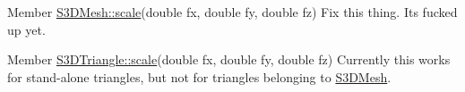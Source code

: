 \label{todo__todo000001}
\hypertarget{todo__todo000001}{}
 
\begin{DoxyDescription}
\item[Member \hyperlink{class_s3_d_mesh_ad1de35530a123dbb515e37afc8ecc0e3}{S3DMesh::scale}(double fx, double fy, double fz) ]Fix this thing. Its fucked up yet. 
\end{DoxyDescription}

\label{todo__todo000002}
\hypertarget{todo__todo000002}{}
 
\begin{DoxyDescription}
\item[Member \hyperlink{class_s3_d_triangle_a0808a047e513fb2322e3fc6465c7c011}{S3DTriangle::scale}(double fx, double fy, double fz) ]Currently this works for stand-\/alone triangles, but not for triangles belonging to \hyperlink{class_s3_d_mesh}{S3DMesh}. 
\end{DoxyDescription}